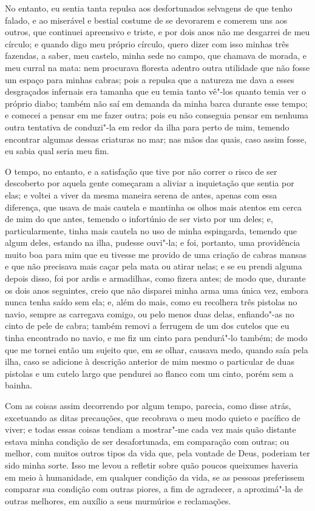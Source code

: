 No entanto, eu sentia tanta repulsa aos desfortunados selvagens de que
tenho falado, e ao miserável e bestial costume de se devorarem e comerem
uns aos outros, que continuei apreensivo e triste, e por dois anos não
me desgarrei de meu círculo; e quando digo meu próprio círculo, quero
dizer com isso minhas três fazendas, a saber, meu castelo, minha sede no
campo, que chamava de morada, e meu curral na mata: nem procurava
floresta adentro outra utilidade que não fosse um espaço para minhas
cabras; pois a repulsa que a natureza me dava a esses desgraçados
infernais era tamanha que eu temia tanto vê"-los quanto temia ver o
próprio diabo; também não saí em demanda da minha barca durante esse
tempo; e comecei a pensar em me fazer outra; pois eu não conseguia
pensar em nenhuma outra tentativa de conduzi"-la em redor da ilha para
perto de mim, temendo encontrar algumas dessas criaturas no mar; nas
mãos das quais, caso assim fosse, eu sabia qual seria meu fim.

O tempo, no entanto, e a satisfação que tive por não correr o risco de
ser descoberto por aquela gente começaram a aliviar a inquietação que
sentia por elas; e voltei a viver da mesma maneira serena de antes,
apenas com essa diferença, que usava de mais cautela e mantinha os olhos
mais atentos em cerca de mim do que antes, temendo o infortúnio de ser
visto por um deles; e, particularmente, tinha mais cautela no uso de
minha espingarda, temendo que algum deles, estando na ilha, pudesse
ouvi"-la; e foi, portanto, uma providência muito boa para mim que eu
tivesse me provido de uma criação de cabras mansas e que não precisava
mais caçar pela mata ou atirar nelas; e se eu prendi alguma depois
disso, foi por ardis e armadilhas, como fizera antes; de modo que,
durante os dois anos seguintes, creio que não disparei minha arma uma
única vez, embora nunca tenha saído sem ela; e, além do mais, como eu
recolhera três pistolas no navio, sempre as carregava comigo, ou pelo
menos duas delas, enfiando"-as no cinto de pele de cabra; também removi a
ferrugem de um dos cutelos que eu tinha encontrado no navio, e me fiz um
cinto para pendurá"-lo também; de modo que me tornei então um sujeito
que, em se olhar, causava medo, quando saía pela ilha, caso se adicione
à descrição anterior de mim mesmo o particular de duas pistolas e um
cutelo largo que pendurei ao flanco com um cinto, porém sem a bainha.

Com as coisas assim decorrendo por algum tempo, parecia, como disse
atrás, excetuando as ditas precauções, que recobrava o meu modo quieto e
pacífico de viver; e todas essas coisas tendiam a mostrar"-me cada vez
mais quão distante estava minha condição de ser desafortunada, em
comparação com outras; ou melhor, com muitos outros tipos da vida que,
pela vontade de Deus, poderiam ter sido minha sorte. Isso me levou a
refletir sobre quão poucos queixumes haveria em meio à humanidade, em
qualquer condição da vida, se as pessoas preferissem comparar sua
condição com outras piores, a fim de agradecer, a aproximá"-la de outras
melhores, em auxílio a seus murmúrios e reclamações.

